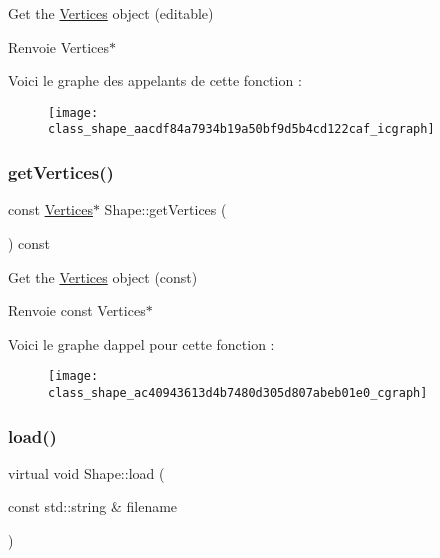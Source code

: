 Get the \hyperlink{struct_shape_1_1_vertices}{Vertices} object (editable) 

\begin{DoxyReturn}{Renvoie}
Vertices$\ast$ 
\end{DoxyReturn}
Voici le graphe des appelants de cette fonction \+:
\nopagebreak
\begin{figure}[H]
\begin{center}
\leavevmode
\texttt{[image: class\_shape\_aacdf84a7934b19a50bf9d5b4cd122caf\_icgraph]}
\end{center}
\end{figure}
\mbox{\label{class_shape_ac40943613d4b7480d305d807abeb01e0}} 
\subsubsection{\texorpdfstring{get\+Vertices()}{getVertices()}\hspace{0.1cm}{\footnotesize\ttfamily [2/2]}}
{\footnotesize\ttfamily const \hyperlink{struct_shape_1_1_vertices}{Vertices}$\ast$ Shape\+::get\+Vertices (\begin{DoxyParamCaption}{ }\end{DoxyParamCaption}) const\hspace{0.3cm}{\ttfamily [inline]}}



Get the \hyperlink{struct_shape_1_1_vertices}{Vertices} object (const) 

\begin{DoxyReturn}{Renvoie}
const Vertices$\ast$ 
\end{DoxyReturn}
Voici le graphe d\textquotesingle{}appel pour cette fonction \+:\nopagebreak
\begin{figure}[H]
\begin{center}
\leavevmode
\texttt{[image: class\_shape\_ac40943613d4b7480d305d807abeb01e0\_cgraph]}
\end{center}
\end{figure}
\mbox{\label{class_shape_a20d654ec232b682c36cd8b28d2cba750}} 
\subsubsection{\texorpdfstring{load()}{load()}}
{\footnotesize\ttfamily virtual void Shape\+::load (\begin{DoxyParamCaption}\item[{const std\+::string \&}]{filename }\end{DoxyParamCaption})\hspace{0.3cm}{\ttfamily [pure virtual]}}



